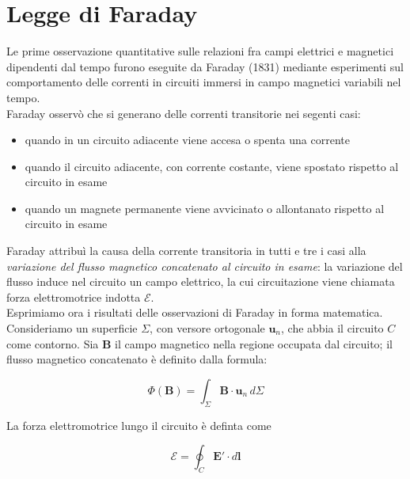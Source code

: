 \restoregeometry


\chapter{Legge di Faraday}

Le prime osservazione quantitative sulle relazioni fra campi elettrici e magnetici dipendenti dal tempo furono eseguite da Faraday (1831) mediante esperimenti sul comportamento delle correnti in circuiti immersi in campo magnetici variabili nel tempo. \\

Faraday osservò che si generano delle correnti transitorie nei segenti casi:

\begin{itemize}
    \item quando in un circuito adiacente viene accesa o spenta una corrente
    \item quando il circuito adiacente, con corrente costante, viene spostato rispetto al circuito in esame
    \item quando un magnete permanente viene avvicinato o allontanato rispetto al circuito in esame
\end{itemize}

Faraday attribuì la causa della corrente transitoria in tutti e tre i casi alla \emph{variazione del flusso magnetico concatenato al circuito in esame}: la variazione del flusso induce nel circuito un campo elettrico, la cui circuitazione viene chiamata forza elettromotrice indotta $\mathcal{E}$. \\

Esprimiamo ora i risultati delle osservazioni di Faraday in forma matematica. Consideriamo un superficie $\Sigma$, con versore ortogonale $\mathbf{u}_n$, che abbia il circuito $C$ come contorno. Sia $\mathbf{B}$ il campo magnetico nella regione occupata dal circuito; il flusso magnetico concatenato è definito dalla formula:

\begin{equation}
\Phi (\mathbf{B}) = \int_{\Sigma} \mathbf{B} \cdot \mathbf{u}_n \, d\Sigma
\end{equation}

La forza elettromotrice lungo il circuito è definta come 

\begin{equation}
    \mathcal{E} = \oint_C \mathbf{E'} \cdot d\mathbf{l}
\end{equation}

